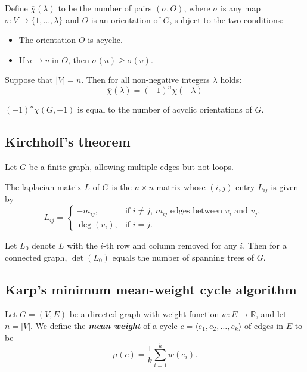 Define $\overline{\chi}(\lambda)$ to be the number of pairs $(\sigma, O)$, 
where $\sigma$ is any map $\sigma : V \rightarrow \{1, \dots, \lambda\}$ and $O$ is an orientation of $G$, 
subject to the two conditions:
\begin{itemize}
\item The orientation $O$ is acyclic.
\item If $u \rightarrow v$ in $O$, then $\sigma (u) \ge \sigma (v)$.
\end{itemize}

\begin{theorem}
    Suppose that $|V| = n$. Then for all non-negative integers $\lambda$ holds:
    $$\overline{\chi}(\lambda) = (-1)^n \chi(-\lambda)$$
\end{theorem}

\begin{corollary}
    $(-1)^n \chi(G, -1)$ is equal to the number of acyclic orientations of $G$.
\end{corollary}

\subsection*{Kirchhoff's theorem}

Let $G$ be a finite graph, allowing multiple edges but not loops.

The laplacian matrix $L$ of $G$ is the $n \times n$ matrix whose
$(i, j)$-entry $L_{i j}$ is given by
\begin{displaymath}
L_{i j} = \left\{ \begin{array}{ll}
-m_{i j}, & \textrm{if $i \ne j$, $m_{i j}$ edges between $v_i$ and $v_j$, } \\
\deg(v_i), & \textrm{if $i = j$.}
\end{array} \right.
\end{displaymath}

Let $L_0$ denote $L$ with the $i$-th row and column removed for any $i$.
Then for a connected graph, $\det(L_0)$ equals the number of spanning trees of $G$.

\subsection*{Karp's minimum mean-weight cycle algorithm}

Let $G = (V, E)$ be a directed graph with weight function $w: E \to \mathbb{R}$,
and let $n = |V|$.
We define the \textbf{\textit{mean weight}} of a cycle
$c= \langle e_1, e_2, \dots, e_k \rangle$ of edges in $E$ to be
$$\mu(c) = \frac{1}{k} \sum_{i=1}^k w(e_i).$$

